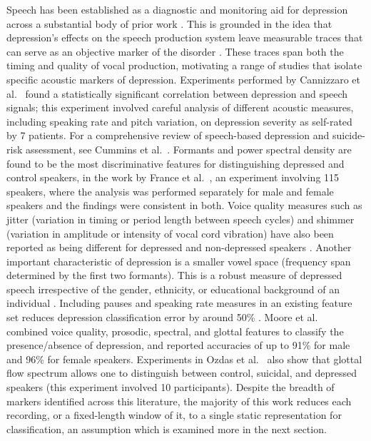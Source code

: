 \documentclass{mproj}
\begin{document}
Speech has been established as a diagnostic and monitoring aid for depression across a substantial body of prior work \cite{cummins2015acoustic,cummins2015review,cummins2014ivectors,scherer2014audiovisual,williamson2014}. This is grounded in the idea that depression's effects on the speech production system leave measurable traces that can serve as an objective marker of the disorder \cite{morales2016}. These traces span both the timing and quality of vocal production, motivating a range of studies that isolate specific acoustic markers of depression. Experiments performed by Cannizzaro et al.\ \cite{cannizzaro2004} found a statistically significant correlation between depression and speech signals; this experiment involved careful analysis of different acoustic measures, including speaking rate and pitch variation, on depression severity as self-rated by 7 patients. For a comprehensive review of speech-based depression and suicide-risk assessment, see Cummins et al.\ \cite{cummins2015review}. Formants and power spectral density are found to be the most discriminative features for distinguishing depressed and control speakers, in the work by France et al.\ \cite{france2000}, an experiment involving 115 speakers, where the analysis was performed separately for male and female speakers and the findings were consistent in both. Voice quality measures such as jitter (variation in timing or period length between speech cycles) and shimmer (variation in amplitude or intensity of vocal cord vibration) have also been reported as being different for depressed and non-depressed speakers \cite{vicsi2012}. Another important characteristic of depression is a smaller vowel space (frequency span determined by the first two formants). This is a robust measure of depressed speech irrespective of the gender, ethnicity, or educational background of an individual \cite{scherer2015vowel}. Including pauses and speaking rate measures in an existing feature set reduces depression classification error by around 50\% \cite{tao2020}. Moore et al.\ \cite{moore2008} combined voice quality, prosodic, spectral, and glottal features to classify the presence/absence of depression, and reported accuracies of up to 91\% for male and 96\% for female speakers. Experiments in Ozdas et al.\ \cite{ozdas2004} also show that glottal flow spectrum allows one to distinguish between control, suicidal, and depressed speakers (this experiment involved 10 participants). Despite the breadth of markers identified across this literature, the majority of this work reduces each recording, or a fixed-length window of it, to a single static representation for classification, an assumption which is examined more in the next section.
\end{document}
